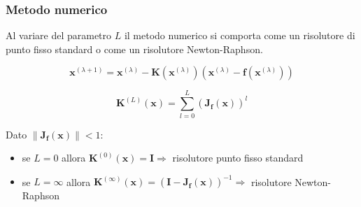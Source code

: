 \documentclass[11pt, t, aspectratio=169]{beamer}
\begin{document}
	\begin{frame}
		\frametitle{Metodo numerico}
		
		Al variare del parametro $L$ il metodo numerico si comporta come un risolutore di punto fisso standard o come un risolutore Newton-Raphson.
		
		\begin{equation}
			\mathbf{x}^{(\lambda+1)} = \mathbf{x}^{(\lambda)}-\mathbf{K}(\mathbf{x}^{(\lambda)})(\mathbf{x}^{(\lambda)}-\mathbf{f}(\mathbf{x}^{(\lambda)}))
		\end{equation}
		
		\begin{equation}
			\mathbf{K}^{(L)}(\mathbf{x}) = \sum_{l=0}^{L} \left(\mathbf{J_{f}(x)}\right)^{l}
		\end{equation}
		
		Dato $\lVert\mathbf{J_{f}(x)}\rVert < 1$:
		\begin{itemize}
			\item se $L = 0$ allora $\mathbf{K}^{(0)}(\mathbf{x}) = \mathbf{I}$\qquad\qquad\qquad\qquad$\Rightarrow$ risolutore punto fisso standard
			\item se $L = \infty$ allora $\mathbf{K}^{(\infty)}(\mathbf{x}) = (\mathbf{I}-\mathbf{J_{f}(x)})^{-1}$\qquad\quad\hspace{-2px}$\Rightarrow$ risolutore Newton-Raphson
		\end{itemize}
	\end{frame}
\end{document}
